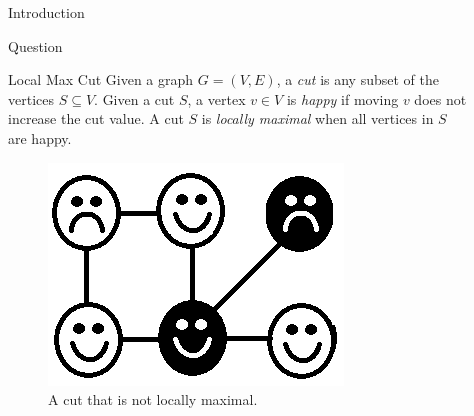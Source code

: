 \documentclass[final]{beamer}
\newlength{\sepwid}
\newlength{\onecolwid}
\newlength{\twocolwid}
\begin{document}
\begin{frame}[t]
\begin{columns}[t]
\begin{column}{\onecolwid}
\begin{block}{Introduction}
\begin{itemize}
\begin{alertblock}{
          Question
          }
        \end{alertblock} 

    \end{itemize}

\end{block}


\vspace{-1.2in}
\begin{block}{Local Max Cut}
    Given a graph $G = (V,E)$, a \textit{cut} is any subset of the vertices $S \subseteq V$. Given a cut $S$, a vertex $v \in V$ is \textit{happy} if moving $v$ does not increase the cut value. A cut $S$ is \textit{locally maximal} when all vertices in $S$ are happy.
\end{block}

\vspace{-.7in}
\begin{figure}[h]
\includegraphics[width=0.6\linewidth]{happy-unhappy.png}
\caption{A cut that is not locally maximal.}
\end{figure}


\end{column} 


\begin{column}{\sepwid}\end{column} %


\begin{column}{\twocolwid}\vspace{-.8in} %



\end{column}
\end{columns}
\end{frame}
\end{document}
